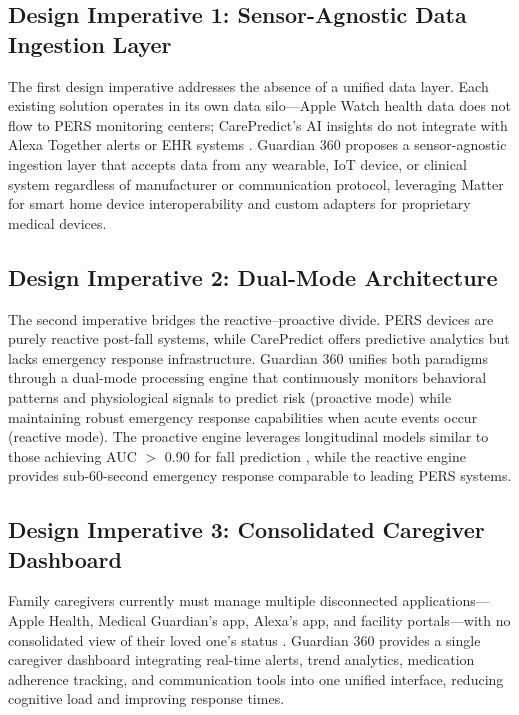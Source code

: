 \documentclass[conference]{IEEEtran}
\begin{document}
\subsection{Design Imperative 1: Sensor-Agnostic Data Ingestion Layer}

The first design imperative addresses the absence of a unified data layer. Each existing solution operates in its own data silo---Apple Watch health data does not flow to PERS monitoring centers; CarePredict's AI insights do not integrate with Alexa Together alerts or EHR systems \cite{hfs2024}. Guardian 360 proposes a sensor-agnostic ingestion layer that accepts data from any wearable, IoT device, or clinical system regardless of manufacturer or communication protocol, leveraging Matter for smart home device interoperability and custom adapters for proprietary medical devices.

\subsection{Design Imperative 2: Dual-Mode Architecture}

The second imperative bridges the reactive--proactive divide. PERS devices are purely reactive post-fall systems, while CarePredict offers predictive analytics but lacks emergency response infrastructure. Guardian 360 unifies both paradigms through a dual-mode processing engine that continuously monitors behavioral patterns and physiological signals to predict risk (proactive mode) while maintaining robust emergency response capabilities when acute events occur (reactive mode). The proactive engine leverages longitudinal models similar to those achieving AUC $>$ 0.90 for fall prediction \cite{npj_fall}, while the reactive engine provides sub-60-second emergency response comparable to leading PERS systems.

\subsection{Design Imperative 3: Consolidated Caregiver Dashboard}

Family caregivers currently must manage multiple disconnected applications---Apple Health, Medical Guardian's app, Alexa's app, and facility portals---with no consolidated view of their loved one's status \cite{hfs2024, milken2024}. Guardian 360 provides a single caregiver dashboard integrating real-time alerts, trend analytics, medication adherence tracking, and communication tools into one unified interface, reducing cognitive load and improving response times.
\end{document}
